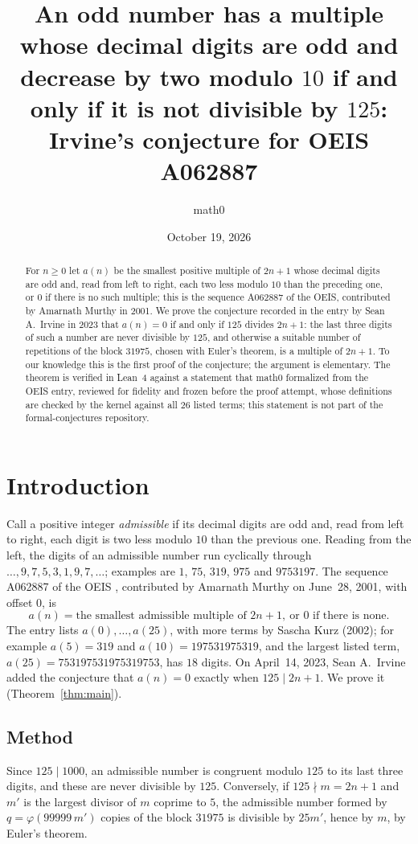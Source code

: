 \documentclass[11pt]{amsart}
\title[Irvine's conjecture for OEIS A062887]{An odd number has a multiple whose decimal digits are odd and decrease by two modulo $10$ if and only if it is not divisible by $125$: Irvine's conjecture for OEIS A062887}
\author{math0}
\date{October 19, 2026}
\theoremstyle{plain}
\theoremstyle{definition}
\begin{document}
\begin{abstract}
For $n\ge0$ let $a(n)$ be the smallest positive multiple of $2n+1$ whose decimal digits are odd and, read from left to right, each two less modulo $10$ than the preceding one, or $0$ if there is no such multiple; this is the sequence A062887 of the OEIS, contributed by Amarnath Murthy in 2001.
We prove the conjecture recorded in the entry by Sean A.~Irvine in 2023 that $a(n)=0$ if and only if $125$ divides $2n+1$: the last three digits of such a number are never divisible by $125$, and otherwise a suitable number of repetitions of the block $31975$, chosen with Euler's theorem, is a multiple of $2n+1$.
To our knowledge this is the first proof of the conjecture; the argument is elementary.
The theorem is verified in Lean~4 against a statement that math0 formalized from the OEIS entry, reviewed for fidelity and frozen before the proof attempt, whose definitions are checked by the kernel against all $26$ listed terms; this statement is not part of the formal-conjectures repository.
\end{abstract}
\maketitle

\section{Introduction}

Call a positive integer \emph{admissible} if its decimal digits are odd and, read from left to right, each digit is two less modulo $10$ than the previous one. Reading from the left, the digits of an admissible number run cyclically through $\dots,9,7,5,3,1,9,7,\dots$; examples are $1$, $75$, $319$, $975$ and $9753197$.
The sequence A062887 of the OEIS \cite{A062887}, contributed by Amarnath Murthy on June~28, 2001, with offset $0$, is
\[
  a(n)=\text{the smallest admissible multiple of }2n+1,\ \text{or }0\text{ if there is none}.
\]
The entry lists $a(0),\dots,a(25)$, with more terms by Sascha Kurz (2002); for example $a(5)=319$ and $a(10)=197531975319$, and the largest listed term, $a(25)=753197531975319753$, has $18$ digits.
On April~14, 2023, Sean A.~Irvine added the conjecture that $a(n)=0$ exactly when $125\mid 2n+1$. We prove it (Theorem~\ref{thm:main}).

\subsection*{Method}
Since $125\mid1000$, an admissible number is congruent modulo $125$ to its last three digits, and these are never divisible by $125$. Conversely, if $125\nmid m=2n+1$ and $m'$ is the largest divisor of $m$ coprime to $5$, the admissible number formed by $q=\varphi(99999\,m')$ copies of the block $31975$ is divisible by $25m'$, hence by $m$, by Euler's theorem.
\end{document}
